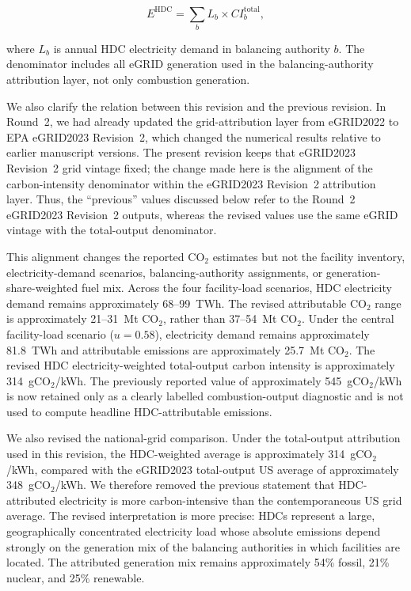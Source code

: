 \documentclass[11pt]{article}
\begin{document}
\[
E^{\mathrm{HDC}} =
\sum_b L_b \times CI_b^{\mathrm{total}},
\]

where $L_b$ is annual HDC electricity demand in balancing authority $b$. The denominator includes all eGRID generation used in the balancing-authority attribution layer, not only combustion generation.

We also clarify the relation between this revision and the previous revision. In Round~2, we had already updated the grid-attribution layer from eGRID2022 to EPA eGRID2023 Revision~2, which changed the numerical results relative to earlier manuscript versions. The present revision keeps that eGRID2023 Revision~2 grid vintage fixed; the change made here is the alignment of the carbon-intensity denominator within the eGRID2023 Revision~2 attribution layer. Thus, the ``previous'' values discussed below refer to the Round~2 eGRID2023 Revision~2 outputs, whereas the revised values use the same eGRID vintage with the total-output denominator.

This alignment changes the reported CO$_2$ estimates but not the facility inventory, electricity-demand scenarios, balancing-authority assignments, or generation-share-weighted fuel mix. Across the four facility-load scenarios, HDC electricity demand remains approximately 68--99~TWh. The revised attributable CO$_2$ range is approximately 21--31~Mt CO$_2$, rather than 37--54~Mt CO$_2$. Under the central facility-load scenario ($u=0.58$), electricity demand remains approximately 81.8~TWh and attributable emissions are approximately 25.7~Mt CO$_2$. The revised HDC electricity-weighted total-output carbon intensity is approximately 314~gCO$_2$/kWh. The previously reported value of approximately 545~gCO$_2$/kWh is now retained only as a clearly labelled combustion-output diagnostic and is not used to compute headline HDC-attributable emissions.

We also revised the national-grid comparison. Under the total-output attribution used in this revision, the HDC-weighted average is approximately 314~gCO$_2$/kWh, compared with the eGRID2023 total-output US average of approximately 348~gCO$_2$/kWh. We therefore removed the previous statement that HDC-attributed electricity is more carbon-intensive than the contemporaneous US grid average. The revised interpretation is more precise: HDCs represent a large, geographically concentrated electricity load whose absolute emissions depend strongly on the generation mix of the balancing authorities in which facilities are located. The attributed generation mix remains approximately 54\% fossil, 21\% nuclear, and 25\% renewable.
\end{document}
